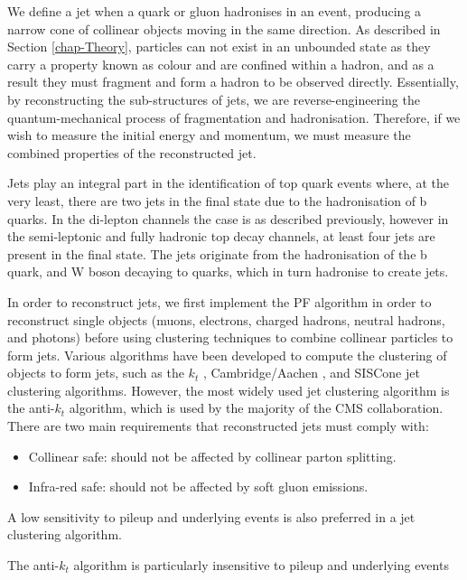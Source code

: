 We define a jet when a quark or gluon hadronises in an event, producing a narrow cone of collinear objects moving in the same direction. As described in Section \ref{chap-Theory}, particles can not exist in an unbounded state as they carry a property known as colour and are confined within a hadron, and as a result they must fragment and form a hadron to be observed directly. Essentially, by reconstructing the sub-structures of jets, we are reverse-engineering the quantum-mechanical process of fragmentation and hadronisation. Therefore, if we wish to measure the initial energy and momentum, we must measure the combined properties of the reconstructed jet. 

Jets play an integral part in the identification of top quark events where, at the very least, there are two jets in the final state due to the hadronisation of b quarks. In the di-lepton channels the case is as described previously, however in the semi-leptonic and fully hadronic top decay channels, at least four jets are present in the final state. The jets originate from the hadronisation of the b quark, and W boson decaying to quarks, which in turn hadronise to create jets.  

In order to reconstruct jets, we first implement the PF algorithm in order to reconstruct single objects (muons, electrons, charged hadrons, neutral hadrons, and photons) before using clustering techniques to combine collinear particles to form jets. Various algorithms have been developed to compute the clustering of objects to form jets, such as the $k_t$ \cite{Ellis:1993tq}, Cambridge/Aachen \cite{Dokshitzer:1997in}, and SISCone \cite{Blazey:2000qt} jet clustering algorithms. However, the most widely used jet clustering algorithm is the anti-$k_t$ \cite{Cacciari:2008gp} algorithm, which is used by the majority of the CMS collaboration. There are two main requirements that reconstructed jets must comply with:

\begin{itemize}
	\item Collinear safe: should not be affected by collinear parton splitting.
	\item Infra-red safe: should not be affected by soft gluon emissions.
\end{itemize}

A low sensitivity to pileup and underlying events is also preferred in a jet clustering algorithm.

The anti-$k_t$ algorithm is particularly insensitive to pileup and underlying events

